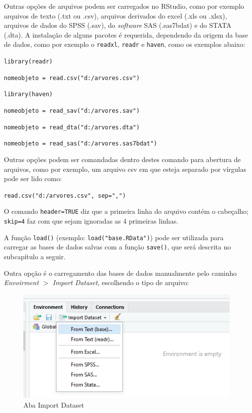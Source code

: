\documentclass[12pt,portuguese,oneside]{book}
\begin{document}
Outras opções de arquivos podem ser carregados no RStudio, como por
exemplo arquivos de texto (.txt ou .csv), arquivos derivados do excel
(.xls ou .xlsx), arquivos de dados do SPSS (.sav), do \emph{software}
SAS (.sas7bdat) e do STATA (.dta). A instalação de alguns pacotes é
requerida, dependendo da origem da base de dados, como por exemplo o
\texttt{readxl}, \texttt{readr} e \texttt{haven}, como os exemplos
abaixo:

\texttt{library(readr)}

\texttt{nomeobjeto\ =\ read.csv("d:/arvores.csv")}

\texttt{library(haven)}

\texttt{nomeobjeto\ =\ read\_sav("d:/arvores.sav")}

\texttt{nomeobjeto\ =\ read\_dta("d:/arvores.dta")}

\texttt{nomeobjeto\ =\ read\_sas("d:/arvores.sas7bdat")}

Outras opções podem ser comandadas dentro destes comando para abertura
de arquivos, como por exemplo, um arquivo csv em que esteja separado por
vírgulas pode ser lido como:

\texttt{read.csv("d:/arvores.csv",\ sep=",")}

O comando \texttt{header=TRUE} diz que a primeira linha do arquivo
contém o cabeçalho; \texttt{skip=4} faz com que sejam ignoradas as 4
primeiras linhas.

A função \texttt{load()} (exemplo: \texttt{load("base.RData")}) pode ser
utilizada para carregar as bases de dados salvas com a função
\texttt{save()}, que será descrita no subcapítulo a seguir.

Outra opção é o carregamento das bases de dados manualmente pelo caminho
\emph{Envoirment \(>\) Import Dataset}, escolhendo o tipo de arquivo:

\begin{figure}[H]

{\centering \includegraphics[width=0.8\linewidth]{r3} 

}

\caption{Aba Import Dataset}\label{fig:r3}
\end{figure}
\end{document}
